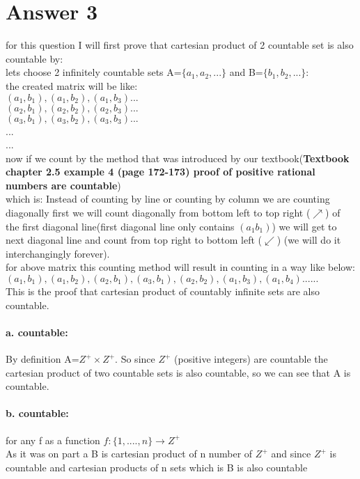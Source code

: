 \documentclass[11pt]{article}
\begin{document}
\section*{Answer 3}
for this question I will first prove that cartesian product of 2 countable set is also countable by:\\
lets choose 2 infinitely countable sets A=$\{a_1,a_2,...\}$ and B=$\{b_1,b_2,...\}$:\\
the created matrix will be like:\\
$(a_1,b_1),(a_1,b_2),(a_1,b_3)...$\\
$(a_2,b_1),(a_2,b_2),(a_2,b_3)...$\\
$(a_3,b_1),(a_3,b_2),(a_3,b_3)...$\\
...\\
...\\
now if we count by the method that was introduced by our textbook(\textbf{Textbook chapter 2.5 example 4 (page 172-173) proof of positive rational numbers are countable})\\
which is: Instead of counting by line or counting by column we are counting diagonally first we will count diagonally from bottom left to top right ($\nearrow$) of the first diagonal line(first diagonal line only contains $(a_1b_1)$) we will get to next diagonal line and count from top right to bottom left ($\swarrow$) (we will do it interchangingly forever).\\
for above matrix this counting method will result in counting in a way like below:\\
$(a_1,b_1),(a_1,b_2),(a_2,b_1),(a_3,b_1),(a_2,b_2),(a_1,b_3),(a_1,b_4)......$\\
This is the proof that cartesian product of countably infinite sets are also countable.

\paragraph{a. countable:}

By definition A=$Z^{+}\times Z^{+}$. So since $Z^{+}$ (positive integers) are countable the cartesian product of two countable sets is also countable, so we can see that A is countable.
\paragraph{b. countable:}
for any f as a function $f:\{1,....,n\}\rightarrow Z^{+}$\\
As it was on part a B is cartesian product of n number of $Z^{+}$ and since $Z^{+}$ is countable and cartesian products of n sets which is B is also countable
\end{document}
